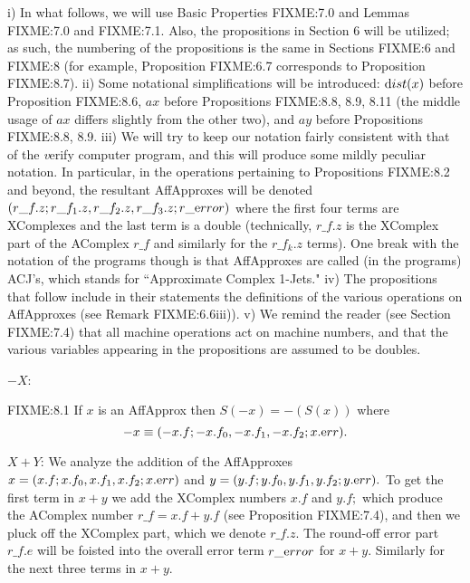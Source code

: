 \begin{conventions}\label{GMT 8.3}
i)  In what follows, we will use Basic Properties FIXME:7.0 and Lemmas FIXME:7.0 and FIXME:7.1.  Also, the propositions in Section 6
will be utilized;  as such, the numbering of the propositions is the same in Sections FIXME:6 and FIXME:8 (for example,
Proposition FIXME:6.7 corresponds to Proposition FIXME:8.7).  
ii)  Some notational simplifications will be introduced: ${\textrm dist}(x)$ before Proposition FIXME:8.6, $ax$ before Propositions FIXME:8.8, 8.9, 8.11
(the middle usage of $ax$ differs slightly from the other two), and $ay$ before Propositions FIXME:8.8, 8.9.
iii)  We will try to keep our notation fairly consistent with that of the {\textit verify} computer program, and this will produce some mildly peculiar notation.  In particular, in the operations pertaining to Propositions FIXME:8.2 and beyond, the resultant AffApproxes will be denoted $(r\_f.z; r\_f_1.z, r\_f_2.z, 
r\_f_3.z; r\_{\textrm error})$
where the first four terms are XComplexes and the last term is a double (technically, $r\_f.z$ is the XComplex part of the AComplex  $r\_f$ and similarly for the $r\_f_k.z$ terms).  One break with the notation of the programs though is that AffApproxes are called (in the programs) ACJ's, which stands for ``Approximate Complex 1-Jets."
iv) The propositions that follow include in their statements the definitions of the various operations on AffApproxes (see Remark
FIXME:6.6iii)).
v)  We remind the reader (see Section FIXME:7.4) that all machine operations act on machine numbers, and that the 
various variables appearing in the propositions are assumed to be doubles.
\end{conventions}

$-X$:

\begin{proposition}{FIXME:8.1}
If $x$ is an AffApprox 
then $S(-x) = -(S(x))$ where
$$-x \equiv (-x.f; -x.f_0,-x.f_1,-x.f_2; x.{\textrm err}).$$ \end{proposition}


$X+Y$:
We analyze the addition of the  {\textrm AffApproxes} 
 $x = (x.f; x.f_0,x.f_1, x.f_2; x.{\textrm err})$  and 
$y = (y.f; y.f_0,y.f_1,y.f_2; y.{\textrm err}).$  To get the first term in $x+y$ we add the XComplex numbers $x.f$ and $y.f;$ which
produce the AComplex number $r\_f = x.f + y.f$ (see Proposition FIXME:7.4), and then we pluck off the XComplex part,
which we denote $r\_f.z.$  The round-off error part $r\_f.e$ will be foisted into the overall error term $r\_{\textrm error}$
for $x+y.$ Similarly for the next three terms in $x + y.$

